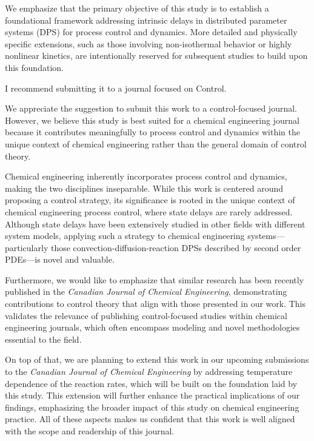 \documentclass[11pt,answers]{exam}
\begin{document}
\begin{questions}
\begin{solutionorbox}
        We emphasize that the primary objective of this study is to establish a foundational framework addressing intrinsic delays in distributed parameter systems (DPS) for process control and dynamics. More detailed and physically specific extensions, such as those involving non-isothermal behavior or highly nonlinear kinetics, are intentionally reserved for subsequent studies to build upon this foundation.       
    \end{solutionorbox}


    \question I recommend submitting it to a journal focused on Control.

    \begin{solutionorbox} \label{comment:2_4}
        We appreciate the suggestion to submit this work to a control-focused journal. However, we believe this study is best suited for a chemical engineering journal because it contributes meaningfully to process control and dynamics within the unique context of chemical engineering rather than the general domain of control theory.

        Chemical engineering inherently incorporates process control and dynamics, making the two disciplines inseparable. While this work is centered around proposing a control strategy, its significance is rooted in the unique context of chemical engineering process control, where state delays are rarely addressed. Although state delays have been extensively studied in other fields with different system models, applying such a strategy to chemical engineering systems—particularly those convection-diffusion-reaction DPSs described by second order PDEs—is novel and valuable. 
        
        Furthermore, we would like to emphasize that similar research \cite{li2024novel, azhin2021modelling} has been recently published in the \textit{Canadian Journal of Chemical Engineering}, demonstrating contributions to control theory that align with those presented in our work. This validates the relevance of publishing control-focused studies within chemical engineering journals, which often encompass modeling and novel methodologies essential to the field.

        On top of that, we are planning to extend this work in our upcoming submissions to the \textit{Canadian Journal of Chemical Engineering} by addressing temperature dependence of the reaction rates, which will be built on the foundation laid by this study. This extension will further enhance the practical implications of our findings, emphasizing the broader impact of this study on chemical engineering practice. All of these aspects makes us confident that this work is well aligned with the scope and readership of this journal.
    \end{solutionorbox}

\end{questions}
\end{document}
